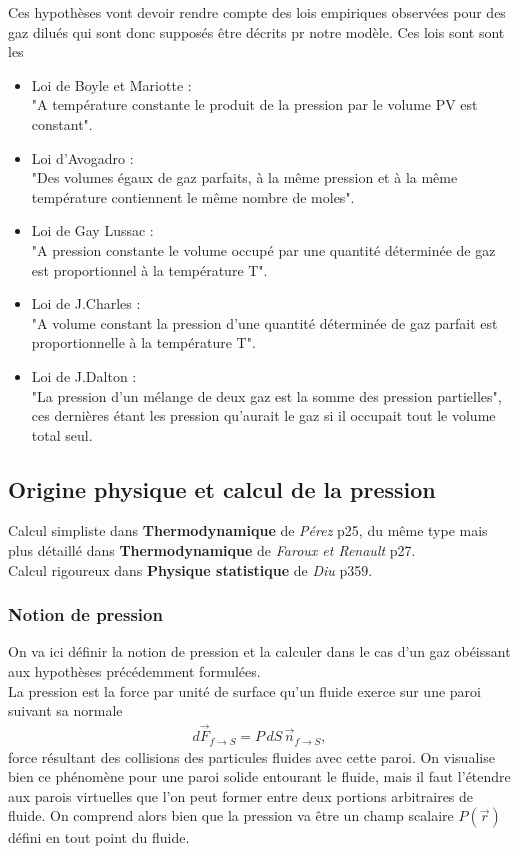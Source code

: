 \documentclass[12pt,prb,aps,epsf]{article}
\begin{document}
Ces hypothèses vont devoir rendre compte des lois empiriques observées pour des gaz dilués qui sont donc supposés être décrits pr notre modèle. Ces lois sont sont les
\begin{itemize}
	\item Loi de Boyle et Mariotte :\\
	"A température constante le produit de la pression par le volume PV est constant".
	\item Loi d'Avogadro :\\
	"Des volumes égaux de gaz parfaits, à la même pression et à la même température contiennent le même nombre de moles".
	\item Loi de Gay Lussac :\\
	"A pression constante le volume occupé par une quantité déterminée de gaz est proportionnel à la température T".
	\item Loi de J.Charles :\\
	"A volume constant la pression d'une quantité déterminée de gaz parfait est proportionnelle à la température T".
	\item Loi de J.Dalton :\\
	"La pression d'un mélange de deux gaz est la somme des pression partielles", ces dernières étant les pression qu'aurait le gaz si il occupait tout le volume total seul.
\end{itemize}

\subsection{Origine physique et calcul de la pression}
Calcul simpliste dans \textbf{Thermodynamique} de \textit{Pérez} p25, du même type mais plus détaillé dans \textbf{Thermodynamique} de \textit{Faroux et Renault} p27.\\
Calcul rigoureux dans \textbf{Physique statistique} de \textit{Diu} p359.\\

\subsubsection{Notion de pression}
On va ici définir la notion de pression et la calculer dans le cas d'un gaz obéissant aux hypothèses précédemment formulées. \\
La pression est la force par unité de surface qu'un fluide exerce sur une paroi suivant sa normale 
\begin{eqnarray}
d\vec{F}_{f\rightarrow S} = P\, dS\,\vec{n}_{f\rightarrow S},
\end{eqnarray} 
force résultant des collisions des particules fluides avec cette paroi. On visualise bien ce phénomène pour une paroi solide entourant le fluide, mais il faut l'étendre aux parois virtuelles que l'on peut former entre deux portions arbitraires de fluide. On comprend alors bien que la pression va être un champ scalaire $P(\vec{r})$ défini en tout point du fluide. 
\end{document}
